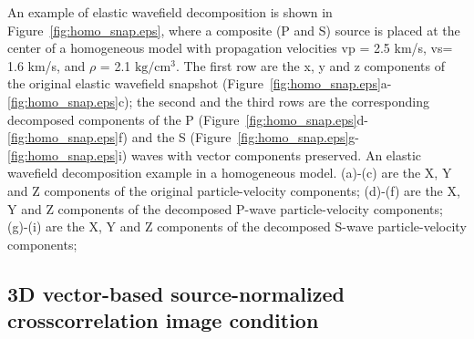 \documentclass[manuscript,ulem,graphix,revised]{geophysics}
\begin{document}
An example of elastic wavefield decomposition is shown in Figure~\ref{fig:homo_snap.eps}, where a composite (P and S) source is placed at the center of a homogeneous model with propagation velocities vp = 2.5 km/s, vs= 1.6 km/s, and $\rho$ = 2.1 $\mathrm{kg/cm^3}$. The first row are the x, y and z components of the original elastic wavefield snapshot (Figure~\ref{fig:homo_snap.eps}a-\ref{fig:homo_snap.eps}c); the second and the third rows are the corresponding decomposed components of the P (Figure~\ref{fig:homo_snap.eps}d-\ref{fig:homo_snap.eps}f) and the S (Figure~\ref{fig:homo_snap.eps}g-\ref{fig:homo_snap.eps}i) waves with vector components preserved. 
{
An elastic wavefield decomposition example in a homogeneous model.
(a)-(c) are the X, Y and Z components of the original particle-velocity components;
(d)-(f) are the X, Y and Z components of the decomposed P-wave particle-velocity components;
(g)-(i) are the X, Y and Z components of the decomposed S-wave particle-velocity components;
}


\subsection{3D vector-based source-normalized crosscorrelation image condition}
\end{document}

